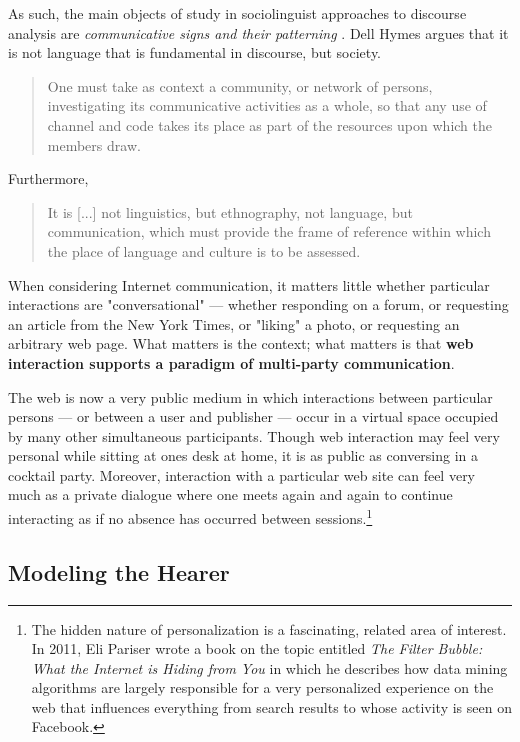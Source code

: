 As such, the main objects of study in sociolinguist approaches to discourse analysis are \emph{communicative signs and their patterning}  \citep{Gumperz:1982tc}.  Dell Hymes argues that it is not language that is fundamental in discourse, but society.

\begin{quote}
One must take as context a community, or network of persons, investigating its communicative activities as a whole, so that any use of channel and code takes its place as part of the resources upon which the members draw. \citep[p. 4]{Hymes:1974wr} 
\end{quote}
Furthermore, 
\begin{quote}
It is [...] not linguistics, but ethnography, not language, but communication, which must provide the frame of reference within which the place of language and culture is to be assessed. \citep[p. 4]{Hymes:1974wr}
\end{quote}
\begin{sloppier}
When considering Internet communication, it matters little whether particular interactions are "conversational" --- whether responding on a forum, or requesting an article from the New York Times, or "liking" a photo, or requesting an arbitrary web page. What matters is the context; what matters is that \textbf{web interaction supports a paradigm of multi-party communication}. 
\end{sloppier}

The web is now a very public medium in which interactions between particular persons --- or between a user and publisher --- occur in a virtual space occupied by many other simultaneous participants. Though web interaction may feel very personal while sitting at ones desk at home, it is as public as conversing in a cocktail party. Moreover, interaction with a particular web site can feel very much as a private dialogue where one meets again and again to continue interacting as if no absence has occurred between  sessions.\footnote{The hidden nature of personalization is a fascinating, related area of interest. In 2011, Eli Pariser wrote a book on the topic entitled \textit{The Filter Bubble: What the Internet is Hiding from You} in which he describes how data mining algorithms are largely responsible for a very personalized experience on the web that influences everything from search results to whose activity is seen on Facebook.} 

\subsection{Modeling the Hearer}
\label{modelingthehearer}


